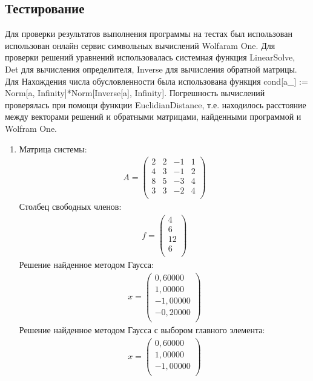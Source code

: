 \documentclass[a4paper,12pt,titlepage,finall]{article}
\begin{document}
\subsection{Тестирование}
Для проверки результатов выполнения программы на тестах был использован использован онлайн сервис символьных вычислений Wolfaram One. Для проверки решений уравнений использовалась системная функция {\ttfamily LinearSolve}, {\ttfamily Det} для вычисления определителя, {\ttfamily Inverse} для вычисления обратной матрицы. Для Нахождения числа обусловленности была использована функция {\ttfamily  cond[a\_] := Norm[a, Infinity]*Norm[Inverse[a], Infinity]}. Погрешность вычислений проверялась при помощи функции {\ttfamily EuclidianDistance}, т.е. находилось расстояние между векторами решений и обратными матрицами, найденными программой и Wolfram One.
\begin{enumerate}
\item
Матрица системы:
\begin{align*}
A = \begin{pmatrix}
2&  2&  -1&  1 \\
4&  3&  -1&  2 \\
8&  5&  -3&  4 \\
3&  3&  -2&  4 \\
\end{pmatrix}
\end{align*}
Столбец свободных членов:
\begin{align*}
f = \begin{pmatrix}
4 \\
6 \\
12 \\
6 \\
\end{pmatrix}
\end{align*}
Решение найденное методом Гаусса:
\begin{align*}
x = \begin{pmatrix}
0,60000 \\
   1,00000 \\
  -1,00000 \\
  -0,20000 \\
\end{pmatrix}
\end{align*}
Решение найденное методом Гаусса с выбором главного элемента:
\begin{align*}
x = \begin{pmatrix}
0,60000 \\
   1,00000 \\
  -1,00000 \\

\end{pmatrix}
\end{align*}
\end{enumerate}
\end{document}
